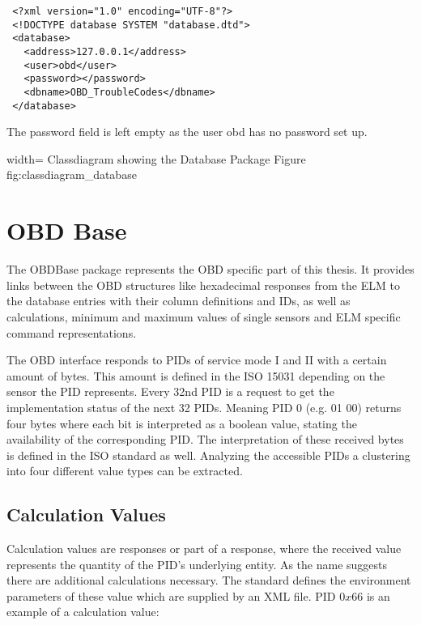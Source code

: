 \begin{verbatim}
 <?xml version="1.0" encoding="UTF-8"?>
 <!DOCTYPE database SYSTEM "database.dtd">
 <database>
   <address>127.0.0.1</address>
   <user>obd</user>
   <password></password>
   <dbname>OBD_TroubleCodes</dbname>
 </database>
\end{verbatim}

The password field is left empty as the user obd has no password set up.  

 {width=\textwidth}%
 {Classdiagram showing the Database Package}%
 {Figure}%
 {fig:classdiagram_database}%


\section{OBD Base}
\label{sec:obdbase}
The OBDBase package represents the OBD specific part of this thesis. It provides links between the OBD structures like hexadecimal responses 
from the ELM to the database entries with their column definitions and IDs, as well as calculations, minimum and maximum values of single 
sensors and ELM specific command representations.

The OBD interface responds to PIDs of service mode I and II with a certain amount of bytes. This amount is defined in the ISO 15031 \cite{ISO15031} depending 
on the sensor the PID represents. Every 32nd PID is a request to get the implementation status of the next 32 PIDs. Meaning 
PID 0 (e.g. 01 00) returns four bytes where each bit is interpreted as a boolean value, stating the availability of the corresponding PID. The 
interpretation of these received bytes is defined in the ISO standard as well. Analyzing the accessible PIDs a clustering into four different value types can be extracted.

\subsection{Calculation Values}
Calculation values are responses or part of a response, where the received value represents the quantity of the PID’s underlying entity. 
As the name suggests there are additional calculations necessary. The standard defines the environment parameters of these value which are 
supplied by an XML file. PID $0x66$ is an example of a calculation value:

